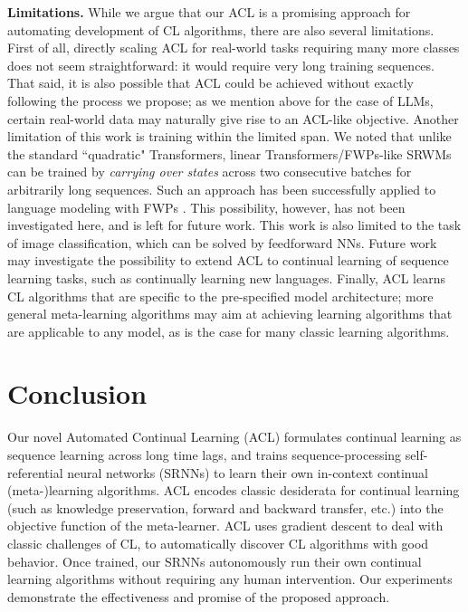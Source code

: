 \documentclass{article}
\begin{document}
\textbf{Limitations.}
While we argue that our ACL is a promising approach for automating development of CL algorithms, there are also several limitations.
First of all, directly scaling ACL for real-world tasks requiring many more classes does not seem straightforward: it would require very long training sequences.
That said, it is also possible that ACL could be achieved without exactly following the process we propose; as we mention above for the case of LLMs, certain real-world data may naturally give rise to an ACL-like objective.
Another limitation of this work is training within the limited span.
We noted that unlike the standard ``quadratic" Transformers, linear Transformers/FWPs-like SRWMs can be trained by \textit{carrying over states} across two consecutive batches for arbitrarily long sequences.
Such an approach has been successfully applied to language modeling with FWPs \citep{schlag2021linear}. This possibility, however, has not been investigated here, and is left for future work.
This work is also limited to the task of image classification, which can be solved by feedforward NNs.
Future work may investigate the possibility to extend ACL to continual learning of sequence learning tasks, such as continually learning new languages.
Finally, ACL learns CL algorithms that are specific to the pre-specified model architecture; more general meta-learning algorithms may aim at achieving learning algorithms that are applicable to any model, as is the case for many classic learning algorithms.



\section{Conclusion}
Our novel Automated Continual Learning (ACL) formulates continual learning as sequence learning across long time lags, and trains sequence-processing self-referential neural networks (SRNNs) to learn their own in-context continual (meta-)learning algorithms. ACL encodes classic desiderata for continual learning (such as knowledge preservation, forward and backward transfer, etc.) into the objective function of the meta-learner. ACL uses gradient descent to deal with classic challenges of CL, to automatically discover CL algorithms with good behavior. Once trained, our SRNNs autonomously run their own continual learning algorithms without requiring any human intervention. Our experiments demonstrate the effectiveness and promise of the proposed approach.
\end{document}
